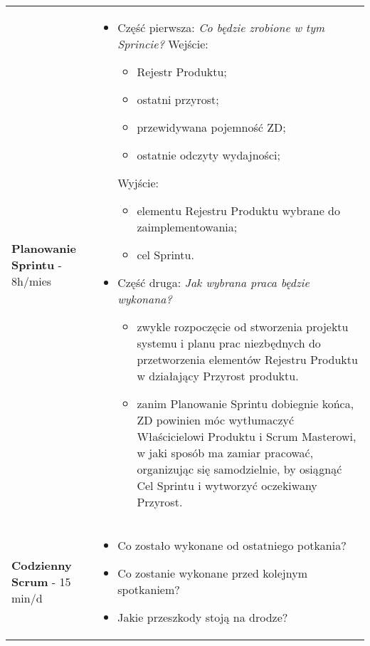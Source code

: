 \documentclass[../main.tex]{subfiles}
\begin{document}
\begin{table}[H]
\begin{center}
\begin{tabular}{ p{} p{} }
                \cmidrule(r){1-1}\cmidrule(l){2-2}
                \textbf{Planowanie Sprintu} - 8h/mies
                &
                \begin{itemize}
                    \item Część pierwsza: \textit{Co będzie zrobione w tym Sprincie?}
                    Wejście:
                    \begin{itemize}
                        \item Rejestr Produktu;
                        \item ostatni przyrost;
                        \item przewidywana pojemność ZD;
                        \item ostatnie odczyty wydajności;
                    \end{itemize}
                    Wyjście:
                    \begin{itemize}
                        \item elementu Rejestru Produktu
                        wybrane do zaimplementowania;
                        \item cel Sprintu.
                    \end{itemize}
                    \item Część druga: \textit{Jak wybrana praca będzie wykonana?}
                    \begin{itemize}
                        \item zwykle rozpoczęcie od stworzenia projektu systemu i planu prac
                        niezbędnych do przetworzenia elementów Rejestru Produktu w działający Przyrost produktu.
                        \item zanim Planowanie Sprintu dobiegnie końca, ZD powinien móc wytłumaczyć Właścicielowi
                        Produktu i Scrum Masterowi, w jaki sposób ma zamiar pracować, organizując się samodzielnie, by osiągnąć Cel
                        Sprintu i wytworzyć oczekiwany Przyrost.
                    \end{itemize}
                \end{itemize}
                \\

                \cmidrule(r){1-1}\cmidrule(l){2-2}
                \textbf{Codzienny Scrum} - 15 min/d
                &
                \begin{itemize}
                    \item Co zostało wykonane od ostatniego potkania?
                    \item Co zostanie wykonane przed kolejnym spotkaniem?
                    \item Jakie przeszkody stoją na drodze?
                \end{itemize}
                \\


\end{tabular}
\end{center}
\end{table}
\end{document}

